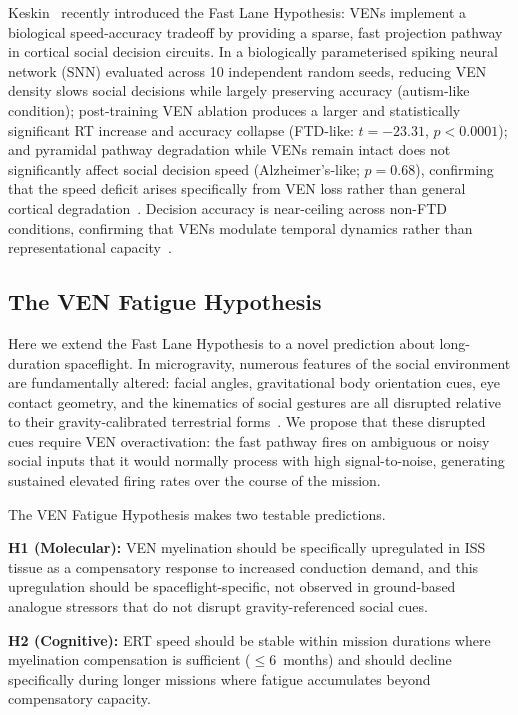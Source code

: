 \documentclass[11pt]{article}
\begin{document}
Keskin~\cite{keskin2026} recently introduced the Fast Lane Hypothesis: VENs
implement a biological speed-accuracy tradeoff by providing a sparse, fast
projection pathway in cortical social decision circuits.
In a biologically parameterised spiking neural network (SNN) evaluated
across 10 independent random seeds, reducing VEN density slows social
decisions while largely preserving accuracy (autism-like condition);
post-training VEN ablation produces a larger and statistically significant
RT increase and accuracy collapse (FTD-like: $t=-23.31$, $p<0.0001$); and
pyramidal pathway degradation while VENs remain intact does not
significantly affect social decision speed (Alzheimer's-like; $p=0.68$),
confirming that the speed deficit arises specifically from VEN loss rather
than general cortical degradation~\cite{keskin2026}.
Decision accuracy is near-ceiling across non-FTD conditions, confirming
that VENs modulate temporal dynamics rather than representational
capacity~\cite{keskin2026}.

\subsection{The VEN Fatigue Hypothesis}
\label{sec:hypothesis}

Here we extend the Fast Lane Hypothesis to a novel prediction about
long-duration spaceflight.
In microgravity, numerous features of the social environment are
fundamentally altered: facial angles, gravitational body orientation cues,
eye contact geometry, and the kinematics of social gestures are all
disrupted relative to their gravity-calibrated terrestrial
forms~\cite{garrett2019}.
We propose that these disrupted cues require VEN overactivation: the fast
pathway fires on ambiguous or noisy social inputs that it would normally
process with high signal-to-noise, generating sustained elevated firing
rates over the course of the mission.

The VEN Fatigue Hypothesis makes two testable predictions.

\textbf{H1 (Molecular):} VEN myelination should be specifically upregulated
in ISS tissue as a compensatory response to increased conduction demand,
and this upregulation should be spaceflight-specific, not observed in
ground-based analogue stressors that do not disrupt gravity-referenced
social cues.

\textbf{H2 (Cognitive):} ERT speed should be stable within mission
durations where myelination compensation is sufficient ($\leq$6~months)
and should decline specifically during longer missions where fatigue
accumulates beyond compensatory capacity.
\end{document}
